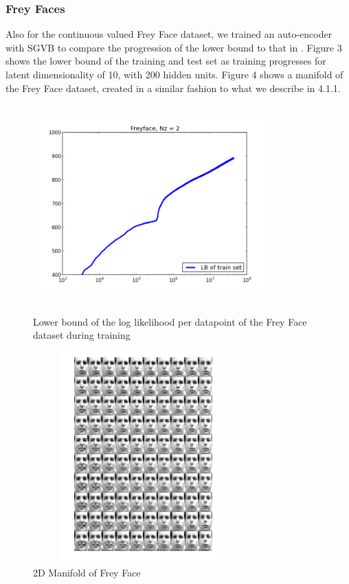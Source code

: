 \documentclass{article}
\begin{document}
\subsubsection{Frey Faces}

Also for the continuous valued Frey Face dataset, we trained an auto-encoder with SGVB to compare the progression of the lower bound to that in \cite{kingma2013auto}. Figure 3 shows the lower bound of the training and test set as training progresses for latent dimensionality of 10, with 200 hidden units. Figure 4 shows a manifold of the Frey Face dataset, created in a similar fashion to what we describe in 4.1.1.

\begin{figure}[htb]
\centering
\begin{minipage}{0.5\textwidth}
\includegraphics[height=3in,width=3.6in]{lowerboundFF.png}
\caption{Lower bound of the log likelihood per datapoint of the Frey Face dataset during training}
\end{minipage}%
\centering
\begin{minipage}{0.5\textwidth}
\includegraphics[height=3.2in,width=3.2in]{manifoldFF.png}\caption{2D Manifold of Frey Face}
\end{minipage}
\end{figure}
\end{document}
